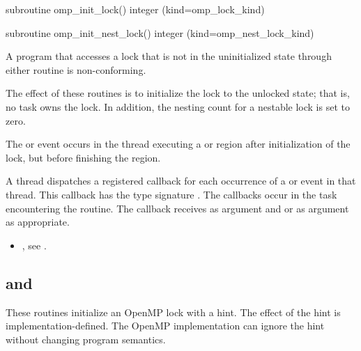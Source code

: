 \begin{fortranspecific}
\begin{boxedcode}
subroutine omp\_init\_lock()
integer (kind=omp\_lock\_kind) 

subroutine omp\_init\_nest\_lock()
integer (kind=omp\_nest\_lock\_kind) 
\end{boxedcode}
\end{fortranspecific}

\constraints
A program that accesses a lock that is not in the uninitialized state through either routine 
is non-conforming.

\effect
The effect of these routines is to initialize the lock to the unlocked state; that is, no task 
owns the lock. In addition, the nesting count for a nestable lock is set to zero.

\events

The  or  event occurs in the thread 
executing a  or  region
after initialization of the lock, but before finishing the region.

\tools

A thread dispatches a registered 
callback for each occurrence of a  or  event 
in that thread.  This callback has the type signature .
The callbacks occur in the task encountering the routine.
The callback receives  as
 argument and
 or 
  as  argument as appropriate.

\crossreferences
\begin{itemize}
\item {}, see
.
\end{itemize}











\subsection[\code{omp\_init\_lock\_with\_hint} and \code{omp\_init\_nest\_lock\_with\_hint}]{ and }
\label{subsec:omp_init_lock_with_hint and omp_init_nest_lock_with_hint}
\summary
These routines initialize an OpenMP lock with a hint.  
The effect of the hint is implementation-defined. The OpenMP implementation
can ignore the hint without changing program semantics.


